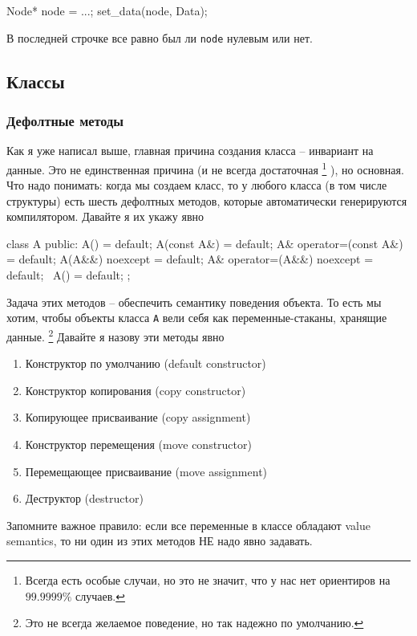 \begin{enumerate}
\begin{cppcode}
Node* node = ...;
set_data(node, Data{});
\end{cppcode}
В последней строчке все равно был ли \verb"node" нулевым или нет.
\end{enumerate}

\subsection{Классы}

\subsubsection{Дефолтные методы}

Как я уже написал выше, главная причина создания класса -- инвариант на данные.
Это не единственная причина (и не всегда достаточная%
\footnote{Всегда есть особые случаи, но это не значит, что у нас нет ориентиров на $99.9999\%$ случаев.}
), но основная.
Что надо понимать: когда мы создаем класс, то у любого класса (в том числе структуры) есть шесть дефолтных методов, которые автоматически генерируются компилятором.
Давайте я их укажу явно
\begin{cppcode}
class A {
public:
  A() = default;
  A(const A&) = default;
  A& operator=(const A&) = default;
  A(A&&) noexcept = default;
  A& operator=(A&&) noexcept = default;
  ~A() = default;
};
\end{cppcode}
Задача этих методов -- обеспечить семантику поведения объекта.
То есть мы хотим, чтобы объекты класса \verb"A" вели себя как переменные-стаканы, хранящие данные.%
\footnote{Это не всегда желаемое поведение, но так надежно по умолчанию.}
Давайте я назову эти методы явно
\begin{enumerate}
\item Конструктор по умолчанию (default constructor)

\item Конструктор копирования (copy constructor)

\item Копирующее присваивание (copy assignment)

\item Конструктор перемещения (move constructor)

\item Перемещающее присваивание (move assignment)

\item Деструктор (destructor)
\end{enumerate}
Запомните важное правило: если все переменные в классе обладают value semantics, то ни один из этих методов НЕ надо явно задавать.
